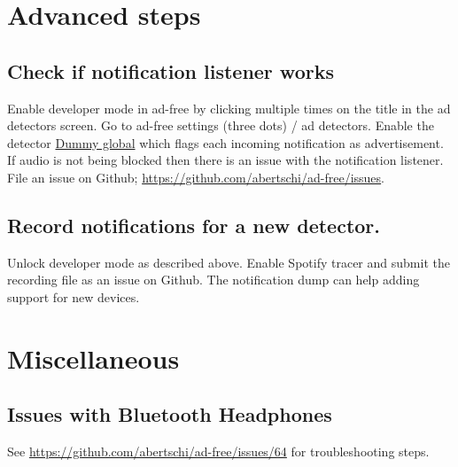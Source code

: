 \documentclass[11pt]{article}
\begin{document}
\section{Advanced steps}
\label{sec:org60db236}
\subsection{Check if notification listener works}
\label{sec:org5d80e2f}
Enable developer mode in ad-free by clicking multiple times on the
title in the ad detectors screen. Go to ad-free settings (three dots)
/ ad detectors. Enable the detector \uline{Dummy global} which flags each
incoming notification as advertisement. If audio is not being blocked
then there is an issue with the notification listener. File an issue
on Github; \url{https://github.com/abertschi/ad-free/issues}.

\subsection{Record notifications for a new detector.}
\label{sec:orgdcbbebb}
Unlock developer mode as described above. Enable Spotify tracer and
submit the recording file as an issue on Github. The notification dump
can help adding support for new devices.


\section{Miscellaneous}
\label{sec:org3fdcc2a}
\subsection{Issues with Bluetooth Headphones}
\label{sec:org24ac2da}
See \url{https://github.com/abertschi/ad-free/issues/64} for troubleshooting steps.
\end{document}

